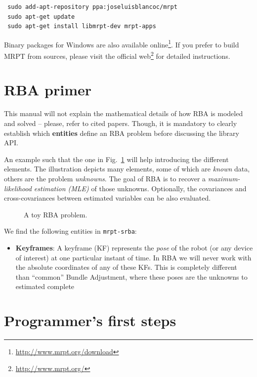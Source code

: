 \documentclass[a4paper,11pt]{article}
\begin{document}
\begin{lstlisting}
 sudo add-apt-repository ppa:joseluisblancoc/mrpt
 sudo apt-get update
 sudo apt-get install libmrpt-dev mrpt-apps
\end{lstlisting}

Binary packages for Windows are also available online\footnote{\href{http://www.mrpt.org/download}{http://www.mrpt.org/download}}.
If you prefer to build MRPT from sources, please visit the official web\footnote{\href{http://www.mrpt.org/}{http://www.mrpt.org/}} 
for detailed instructions.


\section{RBA primer}
\label{sect:rba_primer}

This manual will not explain the mathematical details of how RBA is modeled and solved -- please, refer to cited papers.
Though, it is mandatory to clearly establish which \textbf{entities} define an RBA problem before discussing the library API.

An example such that the one in Fig.~\ref{fig:rba.entities} will help introducing the different elements.
The illustration depicts many elements, some of which are \emph{known} data, others are the problem \emph{unknowns}. 
The goal of RBA is to recover a \emph{maximum-likelihood estimation (MLE)} of those unknowns. Optionally, the covariances and 
cross-covariances between estimated variables can be also evaluated.

\begin{figure}[h]
\centering
\caption{A toy RBA problem.}
\label{fig:rba.entities}
\end{figure}

We find the following entities in \texttt{mrpt-srba}:

\begin{itemize}
\item{\textbf{Keyframes}: A keyframe (KF) represents the \emph{pose} of the robot (or any device of interest) at one 
 particular instant of time. In RBA we will never work with the absolute coordinates of any of these KFs. This is 
 completely different than ``common'' Bundle Adjustment, where these poses are the unknowns to estimated  
 complete 
}
\end{itemize}




\section{Programmer's first steps}
\label{sect:program_first}
\end{document}
